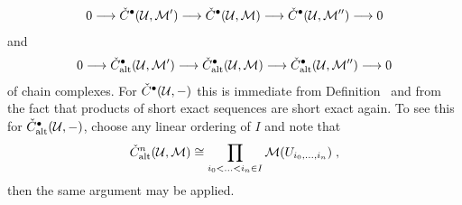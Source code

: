\documentclass[a4paper,parskip=half,numbers=enddot, DIV=12]{scrreprt}
\begin{document}
\begin{align*}
	0\morphism \check{C}^\bullet (\Uu,\Mm')\morphism \check{C}^\bullet (\Uu,\Mm)\morphism \check{C}^\bullet (\Uu,\Mm'')\morphism 0
\end{align*}
and
\begin{align*}
	0\morphism \check{C}_\alt^\bullet (\Uu,\Mm')\morphism \check{C}_\alt^\bullet (\Uu,\Mm)\morphism \check{C}_\alt^\bullet (\Uu,\Mm'')\morphism 0
\end{align*}
of chain complexes. For $\check{C}^\bullet (\mathcal{U},-)$ this is immediate from Definition~ and from the fact that products of short exact sequences are short exact again. To see this for $\check{C}_{\mathrm{alt}}^\bullet (\mathcal{U},-)$, choose any linear ordering of $I$ and note that 
\begin{align*}
	\check{C}_{\mathrm{alt}}^n(\mathcal{U},\mathcal{M})\cong\prod_{i_0<\ldots<i_n\in I}\mathcal{M}(U_{i_0,\ldots,i_n})\;,
\end{align*}
then the same argument may be applied.
\end{document}
